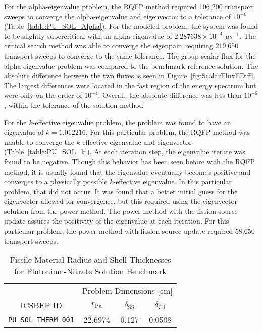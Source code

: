 For the alpha-eigenvalue problem, the RQFP method required 106,200 transport sweeps to converge the alpha-eigenvalue and eigenvector to a tolerance of $10^{-6}$ (Table~\ref{table:PU_SOL_Alpha}). For the modeled problem, the system was found to be slightly supercritical with an alpha-eigenvalue of $2.287638 \times 10^{-4} $ $\mu s^{-1}$. The critical search method was able to converge the eigenpair, requiring 219,650 transport sweeps to converge to the same tolerance. The group scalar flux for the alpha-eigenvalue problem was compared to the benchmark reference solution. The absolute difference between the two  fluxes is seen in Figure~\ref{fig:ScalarFluxEDiff}. The largest differences were located in the fast region of the energy spectrum but were only on the order of $10^{-4}$. Overall, the absolute difference was less than $10^{-6}$, within the tolerance of the solution method.

For the $k$-effective eigenvalue problem, the problem was found to have an eigenvalue of $k = 1.012216$. For this particular problem, the RQFP method was unable to converge the $k$-effective eigenvalue and eigenvector (Table~\ref{table:PU_SOL_k}). At each iteration step, the eigenvalue iterate was found to be negative. Though this behavior has been seen before with the RQFP method, it is usually found that the eigenvalue eventually becomes positive and converges to a physically possible $k$-effective eigenvalue. In this particular problem, that did not occur. It was found that a better initial guess for the eigenvector allowed for convergence, but this required using the eigenvector solution from the power method. The power method with the fission source update assures the positivity of the eigenvalue at each iteration. For this particular problem, the power method with fission source update required 58,650 transport sweeps.

\begin{table}[!htbp]
	\centering{}
	\begin{tabular}{@{}cccc@{}}\toprule
	& \multicolumn{3}{c}{Problem Dimensions [cm]} \\
	\cmidrule{2-4} ICSBEP ID & $r_{\text{Pu}}$ & $\delta_{\text{SS}}$ & $\delta_{\text{Cd}}$ \\
	\midrule
	\texttt{PU\_SOL\_THERM\_001} & 22.6974 & 0.127 & 0.0508 \\
	\bottomrule
	\end{tabular}
	\caption{Fissile Material Radius and Shell Thicknesses for Plutonium-Nitrate Solution Benchmark}
	\label{table:PU_SOL_Dims}
\end{table}

